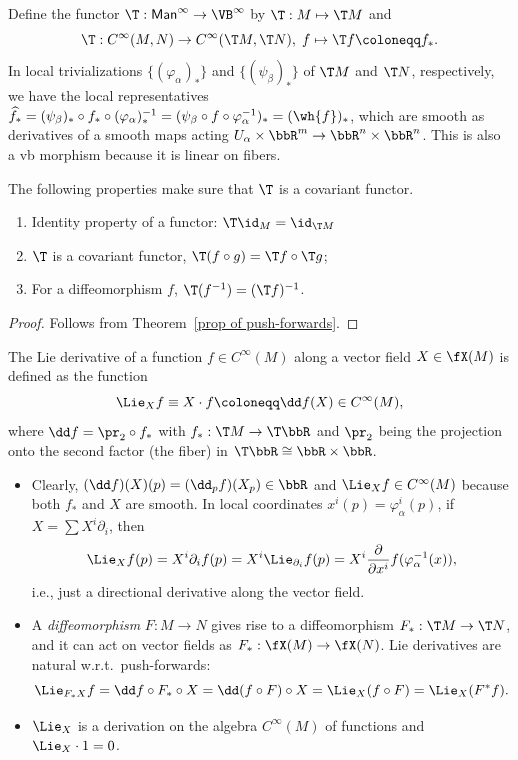 \begin{defn}
    Define the functor $\T:\mathsf{Man}^\infty \to \VB^\infty$ by $\T:M\mapsto \T M$ and \[\T:C^\infty(M,N)\to C^\infty(\T M,\T N),\; f\mapsto \T f\coloneqq f_\ast.\]
    In local trivializations $\{(\varphi_\alpha)_\ast\}$ and $\{(\psi_\beta)_\ast\}$ of $\T M$ and $\T N$, respectively, we have the local representatives $\widehat{ f_\ast}=(\psi_\beta)_\ast\circ f_\ast \circ (\varphi_\alpha)_\ast^{-1}=(\psi_\beta\circ f\circ\varphi_\alpha^{-1})_\ast=(\wh{f})_\ast$, which are smooth as derivatives of a smooth maps acting $U_\alpha\times \bbR^m\to \bbR^{n}\times\bbR^n$. This is also a \gls{vb} morphism because it is linear on fibers.
\end{defn}

\begin{prop}
    The following properties make sure that $\T$ is a covariant functor.
\begin{enumerate}
    \item Identity property of a functor: $\T\id_M=\id_{\T M}$
    \item $\T$ is a covariant functor, $\T(f\circ g)=\T f\circ \T g$;
    \item For a diffeomorphism $f$, $\T(f^{-1})=(\T f)^{-1}$.
\end{enumerate}
\end{prop}
\begin{proof}
    Follows from Theorem~\ref{prop of push-forwards}.
\end{proof}


\begin{defn}
    The Lie derivative of a function $f\in C^\infty(M)$ along a vector field $X\in\fX(M)$ is defined as the function \[\Lie_X f\equiv X\cdot f\coloneqq \dd f (X)\in C^\infty(M),\] where $\dd f=\pr_2\circ f_\ast$ with $f_\ast:\T M\to \T\bbR $ and $\pr_2$ being the projection onto the second factor (the fiber) in $\T\bbR \cong \bbR \times\bbR $. \label{def of Lie derivative}
\end{defn}

\begin{itemize}
    \item Clearly, $(\dd f)(X)(p)=(\dd_p f)(X_p)\in \bbR $ and $\Lie_X f\in C^\infty (M)$ because both $f_\ast$ and $X$ are smooth. In local coordinates $x^i(p)=\varphi_\alpha^i(p)$, if $X=\sum X^i \partial_i$, then 
    \[\Lie_X f(p)=X^i\partial_i f(p)=X^i\Lie_{\partial_i}f(p)=X^i \frac{\partial}{\partial x^i}f(\varphi_\alpha^{-1}(x)),\]
    i.e., just a directional derivative along the vector field.
    \item A \emph{diffeomorphism} $F:M\to N$ gives rise to a diffeomorphism $F_\ast:\T M\to \T N$, and it can act on vector fields as $F_\ast :\fX(M)\to \fX(N)$. Lie derivatives are natural w.r.t.\ push-forwards: 
    \[
    \Lie_{F_\ast X}f=\dd f\circ F_\ast\circ X=\dd (f\circ F)\circ X=\Lie_X (f\circ F)=\Lie_X (F^\ast f).
    \]
    \item $\Lie_X$ is a derivation on the algebra $C^\infty(M)$ of functions and $\Lie_X\cdot 1=0$.
\end{itemize}


